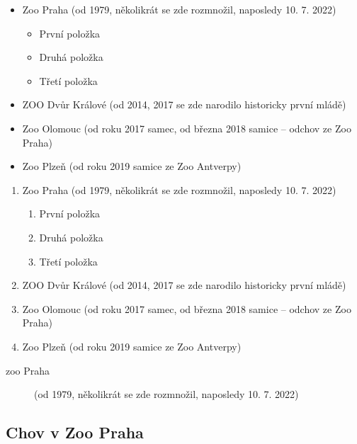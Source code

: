 \documentclass[a4paper, 12pt]{article}
\begin{document}
\begin{itemize}

    \item Zoo Praha (od 1979, několikrát se zde rozmnožil, naposledy 10. 7. 2022)
          \begin{itemize}
              \item První položka
              \item Druhá položka
              \item Třetí položka
          \end{itemize}
    \item ZOO Dvůr Králové (od 2014, 2017 se zde narodilo historicky první mládě)
    \item Zoo Olomouc (od roku 2017 samec, od března 2018 samice – odchov ze Zoo Praha)
    \item Zoo Plzeň (od roku 2019 samice ze Zoo Antverpy)

\end{itemize}

\begin{enumerate}

    \item Zoo Praha (od 1979, několikrát se zde rozmnožil, naposledy 10. 7. 2022)
          \begin{enumerate}
              \item První položka
              \item Druhá položka
              \item Třetí položka
          \end{enumerate}
    \item ZOO Dvůr Králové (od 2014, 2017 se zde narodilo historicky první mládě)
    \item Zoo Olomouc (od roku 2017 samec, od března 2018 samice – odchov ze Zoo Praha)
    \item Zoo Plzeň (od roku 2019 samice ze Zoo Antverpy)

\end{enumerate}

\begin{description}
    \item[zoo Praha] (od 1979, několikrát se zde rozmnožil, naposledy 10. 7. 2022)
\end{description}

\subsection[Praha]{Chov v Zoo Praha}
\end{document}
